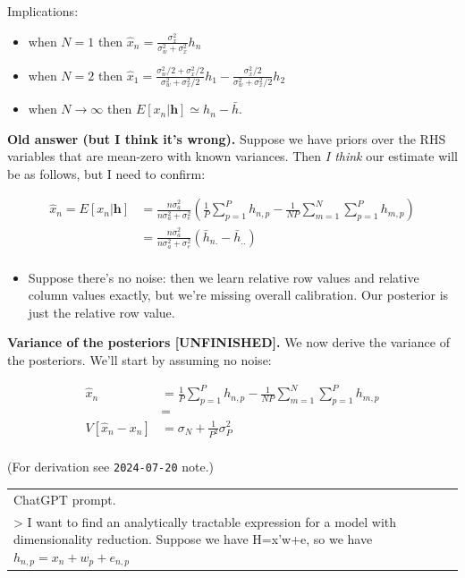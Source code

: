 \documentclass[
  10pt,
  letterpaper,
  DIV=11,
  numbers=noendperiod,
  oneside]{scrartcl}
\providecommand{\tightlist}{%
  \setlength{\itemsep}{0pt}\setlength{\parskip}{0pt}}\usepackage{longtable,booktabs,array}
\newcommand{\bm}[1]{\boldsymbol{#1}}
\begin{document}
Implications:

\begin{itemize}
\tightlist
\item
  when \(N=1\) then
  \(\hat{x}_n=\frac{\sigma_x^2}{\sigma_w^2+\sigma_x^2}h_n\)
\item
  when \(N=2\) then
  \(\hat{x}_1=\frac{\sigma_w^2/2+\sigma_x^2/2}{\sigma_w^2+\sigma_x^2/2}h_1-\frac{\sigma_x^2/2}{\sigma_w^2+\sigma_x^2/2}h_2\)
\item
  when \(N\rightarrow\infty\) then \(E[x_n|\bm{h}]\simeq h_n-\bar{h}\).
\end{itemize}

\textbf{Old answer (but I think it's wrong).} Suppose we have priors
over the RHS variables that are mean-zero with known variances. Then
\emph{I think} our estimate will be as follows, but I need to confirm:

\[\begin{aligned}
   \hat{x}_n= E[x_n | \bm{h}]
      &= \frac{n \sigma_a^2}{n \sigma_a^2 + \sigma_e^2} \left( \frac{1}{P}\sum_{p=1}^P h_{n,p} - \frac{1}{NP}\sum_{m=1}^N\sum_{p=1}^Ph_{m,p} \right)   \\
      &= \frac{n \sigma_a^2}{n \sigma_a^2 + \sigma_e^2} \left( \bar{h}_{n.} - \bar{h}_{..} \right)   \\
\end{aligned}
\]

\begin{itemize}
\tightlist
\item
  Suppose there's no noise: then we learn relative row values and
  relative column values exactly, but we're missing overall calibration.
  Our posterior is just the relative row value.
\end{itemize}

\textbf{Variance of the posteriors {[}UNFINISHED{]}.} We now derive the
variance of the posteriors. We'll start by assuming no noise:

\[\begin{aligned}
   \hat{x}_n &= \frac{1}{P}\sum_{p=1}^P h_{n,p} - \frac{1}{NP}\sum_{m=1}^N\sum_{p=1}^Ph_{m,p}\\
      &= \\
   V[\hat{x}_n-x_n]
      &= \sigma_N+\frac{1}{P^2}\sigma_P^2  \\
\end{aligned}
\]

(For derivation see \texttt{2024-07-20} note.)

\begin{longtable}[]{@{}
  >{\raggedright\arraybackslash}p{}@{}}
\toprule\noalign{}
\endhead
\bottomrule\noalign{}
\endlastfoot
ChatGPT prompt. \\
\textgreater{} I want to find an analytically tractable expression for a
model with dimensionality reduction. Suppose we have H=x'w+e, so we have
\(h_{n,p}= x_n + w_p + e_{n,p}\) \\
\end{longtable}
\end{document}
